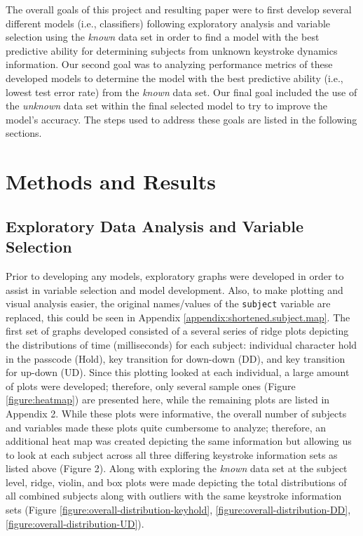 \documentclass[]{article}
\begin{document}
The overall goals of this project and resulting paper were to first
develop several different models (i.e., classifiers) following
exploratory analysis and variable selection using the \emph{known} data
set in order to find a model with the best predictive ability for
determining subjects from unknown keystroke dynamics information. Our
second goal was to analyzing performance metrics of these developed
models to determine the model with the best predictive ability (i.e.,
lowest test error rate) from the \emph{known} data set. Our final goal
included the use of the \emph{unknown} data set within the final
selected model to try to improve the model's accuracy. The steps used to
address these goals are listed in the following sections.

\section{Methods and Results}\label{methods-and-results}

\subsection{Exploratory Data Analysis and Variable
Selection}\label{exploratory-data-analysis-and-variable-selection}

Prior to developing any models, exploratory graphs were developed in
order to assist in variable selection and model development. Also, to
make plotting and visual analysis easier, the original names/values of
the \texttt{subject} variable are replaced, this could be seen in
Appendix \ref{appendix:shortened.subject.map}. The first set of graphs
developed consisted of a several series of ridge plots depicting the
distributions of time (milliseconds) for each subject: individual
character hold in the passcode (Hold), key transition for down-down
(DD), and key transition for up-down (UD). Since this plotting looked at
each individual, a large amount of plots were developed; therefore, only
several sample ones (Figure \ref{figure:heatmap}) are presented here,
while the remaining plots are listed in Appendix 2. While these plots
were informative, the overall number of subjects and variables made
these plots quite cumbersome to analyze; therefore, an additional heat
map was created depicting the same information but allowing us to look
at each subject across all three differing keystroke information sets as
listed above (Figure 2). Along with exploring the \emph{known} data set
at the subject level, ridge, violin, and box plots were made depicting
the total distributions of all combined subjects along with outliers
with the same keystroke information sets (Figure
\ref{figure:overall-distribution-keyhold},
\ref{figure:overall-distribution-DD},
\ref{figure:overall-distribution-UD}).
\end{document}

